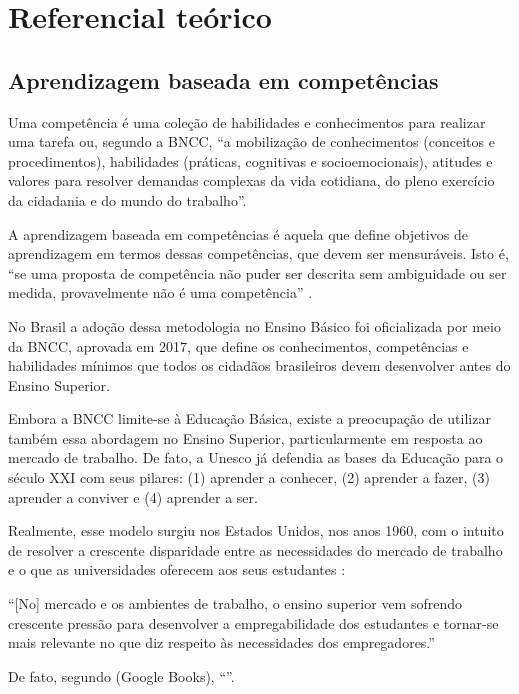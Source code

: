 \section{Referencial teórico}
\subsection{Aprendizagem baseada em competências}
\label{sec:competencias}

Uma competência é uma coleção de habilidades e conhecimentos para realizar uma tarefa \cite{Voorhees2001} ou, segundo a BNCC, ``a mobilização de conhecimentos (conceitos e procedimentos), habilidades (práticas, cognitivas e socioemocionais), atitudes e valores para resolver demandas complexas da vida cotidiana, do pleno exercício da cidadania e do mundo do trabalho''.

A aprendizagem baseada em competências é aquela que define objetivos de aprendizagem em termos dessas competências, que devem ser mensuráveis.
Isto é, ``se uma proposta de competência não puder ser descrita sem ambiguidade ou ser medida, provavelmente não é uma competência'' \cite{Voorhees2001}.

No Brasil a adoção dessa metodologia no Ensino Básico foi oficializada por meio da BNCC, aprovada em 2017, que define os conhecimentos, competências e habilidades mínimos que todos os cidadãos brasileiros devem desenvolver antes do Ensino Superior.

Embora a BNCC limite-se à Educação Básica, existe a preocupação de utilizar também essa abordagem no Ensino Superior, particularmente em resposta ao mercado de trabalho.
De fato, a Unesco já defendia as bases da Educação para o século XXI com seus pilares: (1) aprender a conhecer, (2) aprender a fazer, (3) aprender a conviver e (4) aprender a ser.

Realmente, esse modelo surgiu nos Estados Unidos, nos anos 1960, com o intuito de resolver a crescente disparidade entre as necessidades do mercado de trabalho e o que as universidades oferecem aos seus estudantes \cite{Zulauf2006}:

\begin{mycitation}
	``[No] mercado e os ambientes de trabalho, o ensino superior vem sofrendo crescente pressão para desenvolver a empregabilidade dos estudantes e tornar-se mais relevante no que diz respeito às necessidades dos empregadores.''
\end{mycitation}

De fato, segundo \cite{Gonczi1999} (Google Books), ``''.

